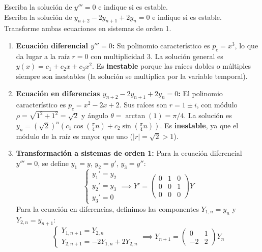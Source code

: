 \begin{ejer}[3]
Escriba la solución de $y'''=0$ e indique si es estable. \\
Escriba la solución de $y_{n+2} - 2 y_{n+1} + 2 y_n = 0$ e indique si es estable. \\
Transforme ambas ecuaciones en sistemas de orden 1.
\end{ejer}
\begin{sol}
\begin{enumerate}
    \item \textbf{Ecuación diferencial $y''' = 0$:}
    Su polinomio característico es $p_c = x^3$, lo que da lugar a la raíz $r=0$ con multiplicidad 3.
    La solución general es $y(x) = c_1 + c_2 x + c_3 x^2$.
    Es \textbf{inestable} porque las raíces dobles o múltiples siempre son inestables (la solución se multiplica por la variable temporal).
    
    \item \textbf{Ecuación en diferencias $y_{n+2} - 2 y_{n+1} + 2 y_n = 0$:}
    El polinomio característico es $p_c = x^2 - 2x + 2$. Sus raíces son $r = 1 \pm i$, con módulo $\rho = \sqrt{1^2 + 1^2} = \sqrt{2}$ y ángulo $\theta = \arctan(1) = \pi/4$.
    La solución es $y_n = (\sqrt{2})^n \left( c_1 \cos\left(\frac{\pi}{4} n\right) + c_2 \sin\left(\frac{\pi}{4} n\right) \right)$.
    Es \textbf{inestable}, ya que el módulo de la raíz es mayor que uno ($\vert{}r\vert{} = \sqrt{2} > 1$).
    
    \item \textbf{Transformación a sistemas de orden 1:}
    Para la ecuación diferencial $y''' = 0$, se define $y_1 = y$, $y_2 = y'$, $y_3 = y''$:
    $$\begin{cases} y_1' = y_2 \\ y_2' = y_3 \\ y_3' = 0 \end{cases} \implies Y' = \begin{pmatrix} 0 & 1 & 0 \\ 0 & 0 & 1 \\ 0 & 0 & 0 \end{pmatrix} Y$$
    Para la ecuación en diferencias, definimos las componentes $Y_{1,n} = y_n$ y $Y_{2,n} = y_{n+1}$:
    $$\begin{cases} Y_{1,n+1} = Y_{2,n} \\ Y_{2,n+1} = -2 Y_{1,n} + 2 Y_{2,n} \end{cases} \implies Y_{n+1} = \begin{pmatrix} 0 & 1 \\ -2 & 2 \end{pmatrix} Y_n$$
\end{enumerate}
\end{sol}

